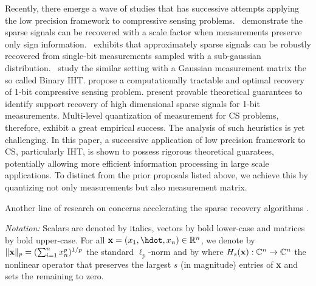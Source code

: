 \documentclass{article}
\begin{document}
Recently, there emerge a wave of studies that has successive attempts applying the low precision framework to compressive sensing problems.~\cite{boufounos20091bitcs} demonstrate the sparse signals can be recovered with a scale factor when measurements preserve only sign information.~\cite{ai20121bitcs, davenport20121bit} exhibits that approximately sparse signals can be robustly recovered from single-bit measurements sampled with a sub-gaussian distribution.~\cite{jacques20111bit, laska20111bitcs} study the similar setting with a Gaussian measurement matrix the so called Binary IHT. \cite{plan20111bitcs, plan20121bitcs} propose a computationally tractable and optimal recovery of 1-bit compressive sensing problem. \cite{recht20121bitcs, gopi20131bitcs} present provable theoretical guarantees to identify support recovery of high dimensional sparse signals for 1-bit measurements. Multi-level quantization of measurement for CS problems, therefore, exhibit a great empirical success. The analysis of such heuristics is yet challenging. In this paper, a successive application of low precision framework to CS, particularly IHT, is shown to possess rigorous theoretical guaratees, potentially allowing more efficient information processing in large scale applications. To distinct from the prior proposals listed above, we achieve this by quantizing not only measurements but also measurement matrix.

Another line of research on concerns accelerating the sparse recovery algorithms \cite{blumensath2011aiht, wei2015fiht, blanchard2013iht, cevher2011ht, liu2017dualiht}. 















{\it Notation:} Scalars are denoted by italics, vectors by bold lower-case and matrices by bold upper-case. For all ${\bf x}= (x_1, \hdot, x_n) \in \mathbb{R}^n$, we denote by $\|{\bf x}\|_p = (\sum_{i=1}^n x_n^p)^{1/p}$ the standard ${\ell}_p$-norm and by
where $H_s({\bf x}): \mathbb{C}^n \rightarrow \mathbb{C}^n$ the nonlinear operator that preserves the largest $s$ (in magnitude) entries of {\bf x} and sets the remaining to zero. 
\end{document}
